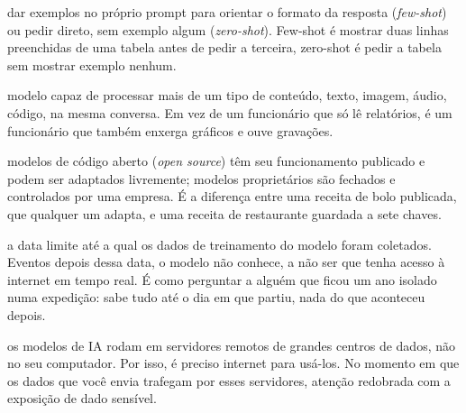 \documentclass[11pt,a4paper]{article}
\begin{document}
\begin{description}[style=nextline,leftmargin=0pt,itemsep=6pt]
  \item[\poppinsmed\color{azulUNI}Few-shot/zero-shot] dar exemplos no próprio prompt para orientar o formato da resposta (\textit{few-shot}) ou pedir direto, sem exemplo algum (\textit{zero-shot}). Few-shot é mostrar duas linhas preenchidas de uma tabela antes de pedir a terceira, zero-shot é pedir a tabela sem mostrar exemplo nenhum.
  \item[\poppinsmed\color{azulUNI}Multimodal] modelo capaz de processar mais de um tipo de conteúdo, texto, imagem, áudio, código, na mesma conversa. Em vez de um funcionário que só lê relatórios, é um funcionário que também enxerga gráficos e ouve gravações.
  \item[\poppinsmed\color{azulUNI}Código aberto vs. proprietário] modelos de código aberto (\textit{open source}) têm seu funcionamento publicado e podem ser adaptados livremente; modelos proprietários são fechados e controlados por uma empresa. É a diferença entre uma receita de bolo publicada, que qualquer um adapta, e uma receita de restaurante guardada a sete chaves.
  \item[\poppinsmed\color{azulUNI}Corte de conhecimento] a data limite até a qual os dados de treinamento do modelo foram coletados. Eventos depois dessa data, o modelo não conhece, a não ser que tenha acesso à internet em tempo real. É como perguntar a alguém que ficou um ano isolado numa expedição: sabe tudo até o dia em que partiu, nada do que aconteceu depois.
  \item[\poppinsmed\color{azulUNI}Nuvem (cloud)] os modelos de IA rodam em servidores remotos de grandes centros de dados, não no seu computador. Por isso, é preciso internet para usá-los. No momento em que os dados que você envia trafegam por esses servidores, atenção redobrada com a exposição de dado sensível.
\end{description}

\end{document}
